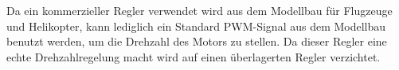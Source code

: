 Da ein kommerzieller Regler verwendet wird aus dem Modellbau für
Flugzeuge und Helikopter, kann lediglich ein Standard PWM-Signal
aus dem Modellbau benutzt werden, um die Drehzahl des Motors zu
stellen. Da dieser Regler eine echte Drehzahlregelung macht wird
auf einen überlagerten Regler verzichtet.
